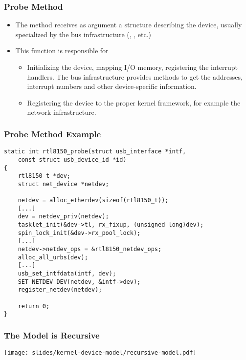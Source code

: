 \begin{frame}
  \frametitle{Probe Method}
  \begin{itemize}
  \item The  method receives as argument a structure
    describing the device, usually specialized by the bus
    infrastructure (, , etc.)
  \item This function is responsible for
    \begin{itemize}
    \item Initializing the device, mapping I/O memory, registering the
      interrupt handlers. The bus infrastructure provides methods to
      get the addresses, interrupt numbers and other device-specific
      information.
    \item Registering the device to the proper kernel framework, for
      example the network infrastructure.
    \end{itemize}
  \end{itemize}
\end{frame}

\begin{frame}[fragile]
\frametitle{Probe Method Example}
\begin{verbatim}
static int rtl8150_probe(struct usb_interface *intf,
    const struct usb_device_id *id)
{
    rtl8150_t *dev;
    struct net_device *netdev;

    netdev = alloc_etherdev(sizeof(rtl8150_t));
    [...]
    dev = netdev_priv(netdev);
    tasklet_init(&dev->tl, rx_fixup, (unsigned long)dev);
    spin_lock_init(&dev->rx_pool_lock);
    [...]
    netdev->netdev_ops = &rtl8150_netdev_ops;
    alloc_all_urbs(dev);
    [...]
    usb_set_intfdata(intf, dev);
    SET_NETDEV_DEV(netdev, &intf->dev);
    register_netdev(netdev);

    return 0;
}
\end{verbatim}
\end{frame}

\begin{frame}
  \frametitle{The Model is Recursive}
  \begin{center}
    \texttt{[image: slides/kernel-device-model/recursive-model.pdf]}
  \end{center}
\end{frame}

